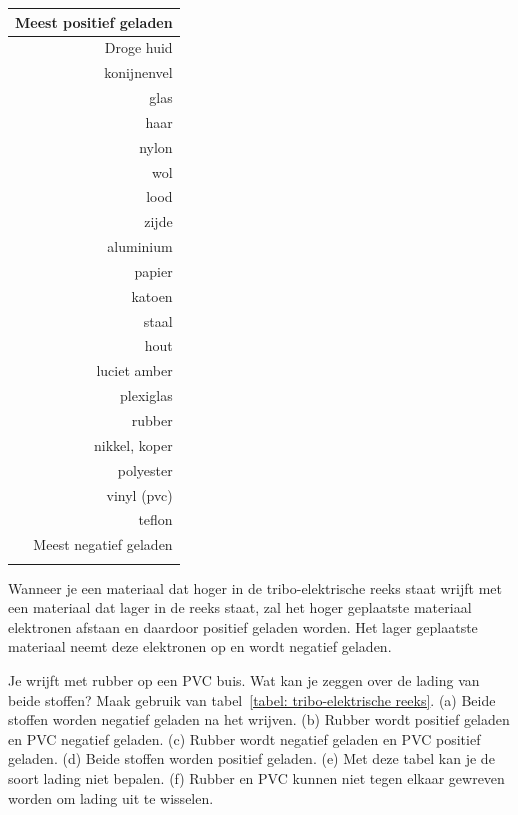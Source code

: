 \begin{margintable}
	\caption{Tribe-elektrische reeks}
		\begin{tabularx}{\marginparwidth}{@{}r@{}}
			\toprule
			Meest positief geladen\\
			\midrule
			Droge huid\\
			konijnenvel\\
			glas\\
			haar\\
			nylon\\
			wol\\
			lood\\
			zijde\\
			aluminium\\
			papier\\
			katoen\\
			staal\\
			hout\\
			luciet
			amber\\
			plexiglas\\
			rubber\\
			nikkel, koper\\
			polyester\\
			vinyl (pvc)\\
			teflon\\
			\midrule
			Meest negatief geladen\\
			\bottomrule
			\addlinespace[3mm]
		\end{tabularx}
		\label{tabel: tribo-elektrische reeks}
\end{margintable}
Wanneer je een materiaal dat hoger in de tribo-elektrische reeks staat wrijft met een materiaal dat lager in de reeks staat, zal het hoger geplaatste materiaal elektronen afstaan en daardoor positief geladen worden. Het lager geplaatste materiaal neemt deze elektronen op en wordt negatief geladen.


\vspace{2mm}
\begin{quiz}\label{q:tribo-elektrische reeks} 
Je wrijft met rubber op een PVC buis. Wat kan je zeggen over de lading van beide stoffen? Maak gebruik van tabel~\ref{tabel: tribo-elektrische reeks}. (a) Beide stoffen worden negatief geladen na het wrijven. (b) Rubber wordt positief geladen en PVC negatief geladen. (c) Rubber wordt negatief geladen en PVC positief geladen. (d) Beide stoffen worden positief geladen. (e) Met deze tabel kan je de soort lading niet bepalen. (f) Rubber en PVC kunnen niet tegen elkaar gewreven worden om lading uit te wisselen.
\end{quiz}



